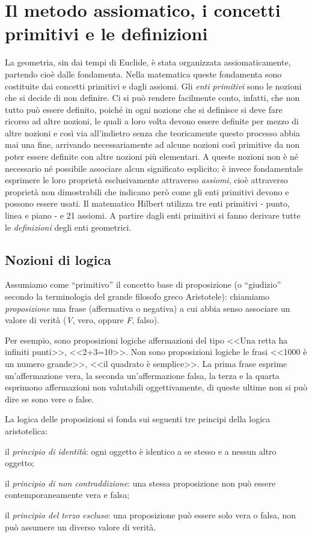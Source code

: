 \section{Il metodo assiomatico, i concetti primitivi e le definizioni}
La geometria, sin dai tempi di Euclide, è stata organizzata assiomaticamente, partendo cioè dalle fondamenta. Nella matematica queste fondamenta sono costituite dai concetti primitivi e dagli assiomi. Gli \emph{enti primitivi} sono le nozioni che si decide di non definire. Ci si può rendere facilmente conto, infatti, che non tutto può essere definito, poiché in ogni nozione che si definisce si deve fare ricorso ad altre nozioni, le quali a loro volta devono essere definite per mezzo di altre nozioni e così via all’indietro senza che teoricamente questo processo abbia mai una fine, arrivando necessariamente ad alcune nozioni così primitive da non poter essere definite con altre nozioni più elementari. A queste nozioni non è né necessario né possibile associare alcun significato esplicito; è invece fondamentale esprimere le loro proprietà esclusivamente attraverso \emph{assiomi}, cioè attraverso proprietà non dimostrabili che indicano però come gli enti primitivi devono e possono essere usati. Il matematico Hilbert utilizza tre enti primitivi - punto, linea e piano - e 21 assiomi. A partire dagli enti primitivi si fanno derivare tutte le \emph{definizioni} degli enti geometrici.

\subsection{Nozioni di logica}

Assumiamo come ``primitivo'' il concetto base di proposizione (o “giudizio” secondo la terminologia del grande filosofo greco Aristotele): chiamiamo \emph{proposizione} una frase (affermativa o negativa) a cui abbia senso associare un valore di verità (\emph{V}, vero, oppure \emph{F}, falso).

Per esempio, sono proposizioni logiche affermazioni del tipo <<Una retta ha infiniti punti>>, <<2+3=10>>. Non sono proposizioni logiche le frasi <<1000 è un numero grande>>, <<il quadrato è semplice>>. La prima frase esprime un’affermazione vera, la seconda un’affermazione falsa, la terza e la quarta esprimono affermazioni non valutabili oggettivamente, di queste ultime non si può dire se sono vere o false.

La logica delle proposizioni si fonda sui seguenti tre principi della logica aristotelica:
\begin{itemize*}
\item il \emph{principio di identità}: ogni oggetto è identico a se stesso e a nessun altro oggetto;
\item il \emph{principio di non contraddizione}: una stessa proposizione non può essere contemporaneamente vera e falsa;
\item il \emph{principio del terzo escluso}: una proposizione può essere solo vera o falsa, non può assumere un diverso valore di verità.
\end{itemize*}


